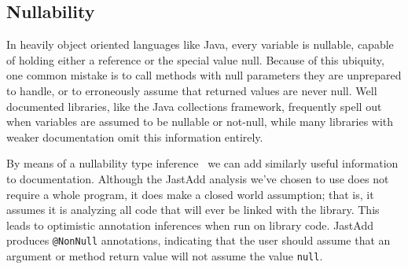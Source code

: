 \subsection{Nullability}
\label{sec:Nullability}

In heavily object oriented languages like Java, every variable is nullable,
capable of holding either a reference or the
special value null.  Because of this ubiquity, one common mistake is to call
methods with null parameters they are unprepared to handle, or to erroneously
assume that returned values are never null.  Well documented libraries, like
the Java collections framework, frequently spell out when variables are
assumed to be nullable or not-null, while many libraries with weaker
documentation omit this information entirely.

By means of a nullability type inference~\cite{NonNullTypeInference} we can add
similarly useful information to documentation.  Although the JastAdd analysis
we've chosen to use does not require a whole program, it does make a closed
world assumption; that is, it assumes it is analyzing all code that will ever be
linked with the library.  This leads to optimistic annotation inferences when run on
library code.  JastAdd produces \texttt{@NonNull} annotations, indicating that the user should assume that an
argument or method return value will not assume the value \texttt{null}.
